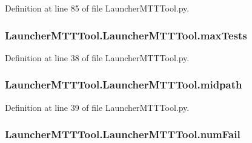 Definition at line 85 of file Launcher\-M\-T\-T\-Tool.\-py.

\hypertarget{class_launcher_m_t_t_tool_1_1_launcher_m_t_t_tool_aa8e59ca462ace6b189cd849a08afa639}{
\subsubsection[{max\-Tests}]{\setlength{\rightskip}{0pt plus 5cm}Launcher\-M\-T\-T\-Tool.\-Launcher\-M\-T\-T\-Tool.\-max\-Tests}}\label{class_launcher_m_t_t_tool_1_1_launcher_m_t_t_tool_aa8e59ca462ace6b189cd849a08afa639}


Definition at line 38 of file Launcher\-M\-T\-T\-Tool.\-py.

\hypertarget{class_launcher_m_t_t_tool_1_1_launcher_m_t_t_tool_a37f255feb0dac2f1eb0e6eff2746bd7b}{
\subsubsection[{midpath}]{\setlength{\rightskip}{0pt plus 5cm}Launcher\-M\-T\-T\-Tool.\-Launcher\-M\-T\-T\-Tool.\-midpath}}\label{class_launcher_m_t_t_tool_1_1_launcher_m_t_t_tool_a37f255feb0dac2f1eb0e6eff2746bd7b}


Definition at line 39 of file Launcher\-M\-T\-T\-Tool.\-py.

\hypertarget{class_launcher_m_t_t_tool_1_1_launcher_m_t_t_tool_a17fe6e6f8981cc1f7cd1953cac37668a}{
\subsubsection[{num\-Fail}]{\setlength{\rightskip}{0pt plus 5cm}Launcher\-M\-T\-T\-Tool.\-Launcher\-M\-T\-T\-Tool.\-num\-Fail}}\label{class_launcher_m_t_t_tool_1_1_launcher_m_t_t_tool_a17fe6e6f8981cc1f7cd1953cac37668a}


